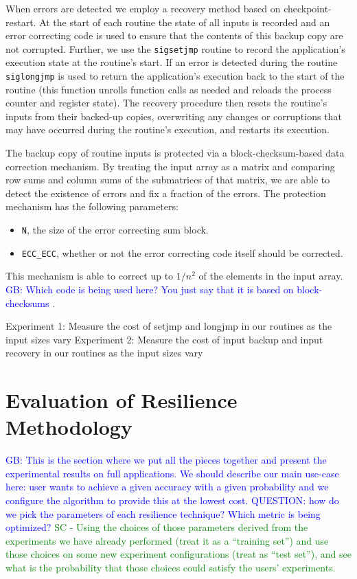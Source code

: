 \documentclass{sig-alternate}
\newcommand{\sui}[1]{%
  \textcolor{green}{SC - #1}
}
\newcommand{\greg}[1]{%
  \textcolor{blue}{GB: #1}
}
\begin{document}
When errors are detected we employ a recovery method based on checkpoint-restart.
At the start of each routine the state of all inputs is recorded and an error correcting code is used to ensure that the contents of this backup copy are not corrupted.
Further, we use the \texttt{sigsetjmp} routine to record the application's execution state at the routine's start.
If an error is detected during the routine \texttt{siglongjmp} is used to return the application's execution back to the start of the routine (this function unrolls function calls as needed and reloads the process counter and register state).
The recovery procedure then resets the routine's inputs from their backed-up copies, overwriting any changes or corruptions that may have occurred during the routine's execution, and restarts its execution.

The backup copy of routine inputs is protected via a block-checksum-based data correction mechanism.
By treating the input array as a matrix and comparing row sums and column sums of the submatrices of that matrix, we are able to detect the existence of errors and fix a fraction of the errors.
The protection mechanism has the following parameters:
\begin{itemize}
\item{\texttt{N}, the size of the error correcting sum block.}
\item{\texttt{ECC\_ECC}, whether or not the error correcting code itself should be corrected.}
\end{itemize}
This mechanism is able to correct up to $1/{n^2}$ of the elements in the input array.
\greg{Which code is being used here? You just say that it is based on block-checksums}.

Experiment 1: Measure the cost of setjmp and longjmp in our routines as the input sizes vary
Experiment 2: Measure the cost of input backup and input recovery in our routines as the input sizes vary

\section{Evaluation of Resilience Methodology}
\label{sec:eval}

\greg{This is the section where we put all the pieces together and present the experimental results on full applications. We should describe our main use-case here: user wants to achieve a given accuracy with a given probability and we configure the algorithm to provide this at the lowest cost. QUESTION: how do we pick the parameters of each resilience technique? Which metric is being optimized?} \sui{Using the choices of those parameters derived from the experiments we have already performed (treat it as a ``training set'') and use those choices on some new experiment configurations (treat as ``test set''), and see what is the probability that those choices could satisfy the users' experiments.}
\end{document}
